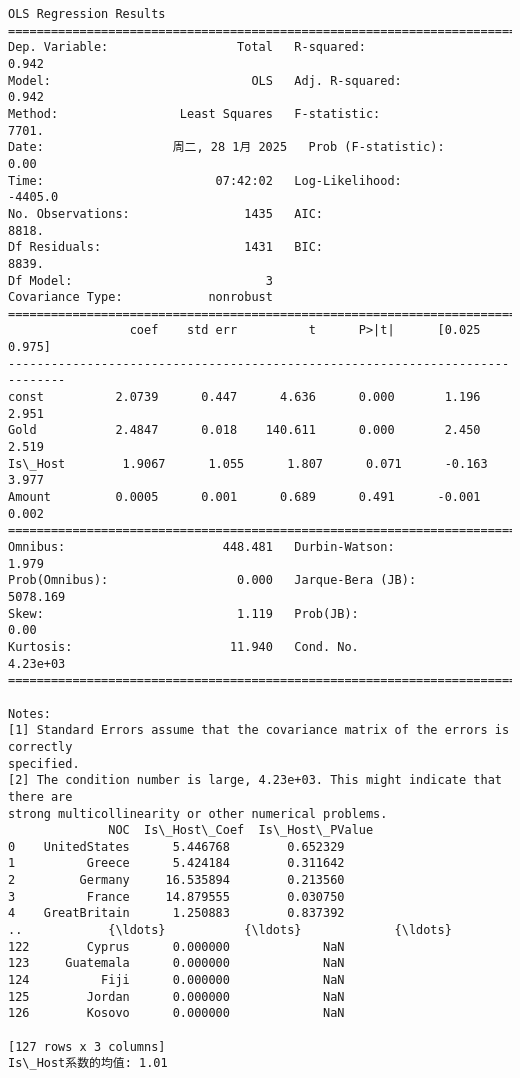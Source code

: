 \documentclass[11pt]{article}
\begin{document}
    \begin{Verbatim}[commandchars=\\\{\}]
                            OLS Regression Results
==============================================================================
Dep. Variable:                  Total   R-squared:                       0.942
Model:                            OLS   Adj. R-squared:                  0.942
Method:                 Least Squares   F-statistic:                     7701.
Date:                  周二, 28 1月 2025   Prob (F-statistic):               0.00
Time:                        07:42:02   Log-Likelihood:                -4405.0
No. Observations:                1435   AIC:                             8818.
Df Residuals:                    1431   BIC:                             8839.
Df Model:                           3
Covariance Type:            nonrobust
==============================================================================
                 coef    std err          t      P>|t|      [0.025      0.975]
------------------------------------------------------------------------------
const          2.0739      0.447      4.636      0.000       1.196       2.951
Gold           2.4847      0.018    140.611      0.000       2.450       2.519
Is\_Host        1.9067      1.055      1.807      0.071      -0.163       3.977
Amount         0.0005      0.001      0.689      0.491      -0.001       0.002
==============================================================================
Omnibus:                      448.481   Durbin-Watson:                   1.979
Prob(Omnibus):                  0.000   Jarque-Bera (JB):             5078.169
Skew:                           1.119   Prob(JB):                         0.00
Kurtosis:                      11.940   Cond. No.                     4.23e+03
==============================================================================

Notes:
[1] Standard Errors assume that the covariance matrix of the errors is correctly
specified.
[2] The condition number is large, 4.23e+03. This might indicate that there are
strong multicollinearity or other numerical problems.
              NOC  Is\_Host\_Coef  Is\_Host\_PValue
0    UnitedStates      5.446768        0.652329
1          Greece      5.424184        0.311642
2         Germany     16.535894        0.213560
3          France     14.879555        0.030750
4    GreatBritain      1.250883        0.837392
..            {\ldots}           {\ldots}             {\ldots}
122        Cyprus      0.000000             NaN
123     Guatemala      0.000000             NaN
124          Fiji      0.000000             NaN
125        Jordan      0.000000             NaN
126        Kosovo      0.000000             NaN

[127 rows x 3 columns]
Is\_Host系数的均值: 1.01
    \end{Verbatim}
\end{document}
